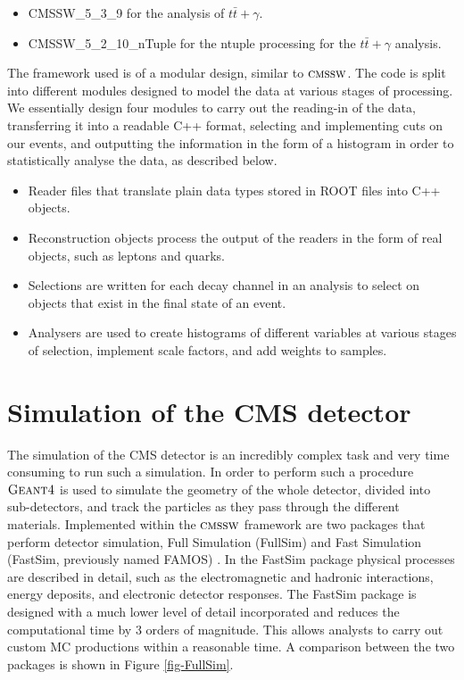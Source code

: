 \begin{itemize}
	\item CMSSW\_5\_3\_9 for the analysis of $t\bar{t}+\gamma$.
	\item CMSSW\_5\_2\_10\_nTuple for the ntuple processing for the $t\bar{t}+\gamma$ analysis.
\end{itemize} 

The framework used is of a modular design, similar to ${\textsc{cmssw}}$. The code is split into different modules designed to model the data at various stages of processing. We essentially design four modules to carry out the reading-in of the data, transferring it into a readable C++ format, selecting and implementing cuts on our events, and outputting the information in the form of a histogram in order to statistically analyse the data, as described below. 

\begin{itemize}
	\item Reader files that translate plain data types stored in ROOT files into C++ objects. 
	\item Reconstruction objects process the output of the readers in the form of real objects, such as leptons and quarks.
	\item Selections are written for each decay channel in an analysis to select on objects that exist in the final state of an event.
	\item Analysers are used to create histograms of different variables at various stages of selection, implement scale factors, and add weights to samples. 
\end{itemize}

\section{Simulation of the CMS detector}

The simulation of the CMS detector is an incredibly complex task and very time consuming to run such a simulation. In order to perform such a procedure ${\textsc{Geant4}}$ \cite{GEANT4} is used to simulate the geometry of the whole detector, divided into sub-detectors, and track the particles as they pass through the different materials. Implemented within the ${\textsc{cmssw}}$ framework are two packages that perform detector simulation, Full Simulation (FullSim) \cite{FullSim} and Fast Simulation (FastSim, previously named FAMOS) \cite{1742-6596-513-2-022012}.  
In the FastSim package physical processes are described in detail, such as the electromagnetic and hadronic interactions, energy deposits, and electronic detector responses. The FastSim package is designed with a much lower level of detail incorporated and reduces the computational time by 3 orders of magnitude. This allows analysts to carry out custom MC productions within a reasonable time. A comparison between the two packages is shown in Figure \ref{fig-FullSim}. 

